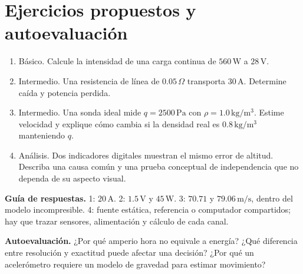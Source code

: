 \section{Ejercicios propuestos y autoevaluación}
\begin{enumerate}
\item Básico. Calcule la intensidad de una carga continua de $560\,\mathrm{W}$ a $28\,\mathrm{V}$.
\item Intermedio. Una resistencia de línea de $0.05\,\Omega$ transporta $30\,\mathrm{A}$. Determine caída y potencia perdida.
\item Intermedio. Una sonda ideal mide $q=2500\,\mathrm{Pa}$ con $\rho=1.0\,\mathrm{kg/m^3}$. Estime velocidad y explique cómo cambia si la densidad real es $0.8\,\mathrm{kg/m^3}$ manteniendo $q$.
\item Análisis. Dos indicadores digitales muestran el mismo error de altitud. Describa una causa común y una prueba conceptual de independencia que no dependa de su aspecto visual.
\end{enumerate}
\textbf{Guía de respuestas.} 1: $20\,\mathrm{A}$. 2: $1.5\,\mathrm{V}$ y $45\,\mathrm{W}$. 3: $70.71$ y $79.06\,\mathrm{m/s}$, dentro del modelo incompresible. 4: fuente estática, referencia o computador compartidos; hay que trazar sensores, alimentación y cálculo de cada canal.

\textbf{Autoevaluación.} ¿Por qué amperio hora no equivale a energía? ¿Qué diferencia entre resolución y exactitud puede afectar una decisión? ¿Por qué un acelerómetro requiere un modelo de gravedad para estimar movimiento?
